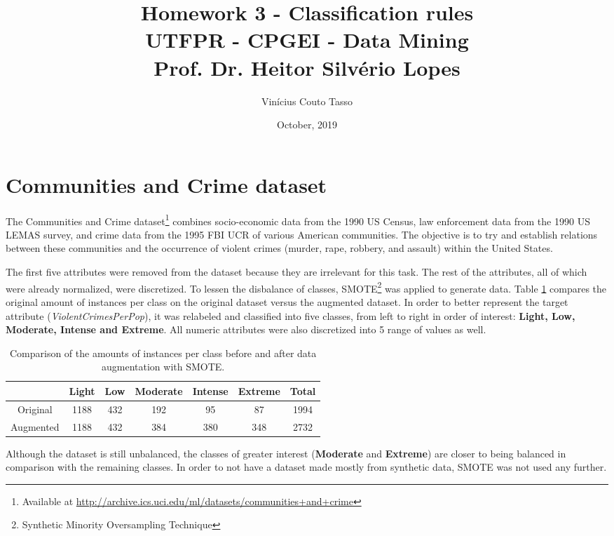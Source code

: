 \documentclass{article}
\title{Homework 3 - Classification rules \\
        \vspace{5px} \large UTFPR - CPGEI - Data Mining \\
        Prof. Dr. Heitor Silvério Lopes}
\author{Vinícius Couto Tasso}
\date{October, 2019}
\begin{document}
\maketitle

\section*{Communities  and  Crime  dataset}

The Communities and Crime dataset\footnote{Available at \href{http://archive.ics.uci.edu/ml/datasets/communities+and+crime}{http://archive.ics.uci.edu/ml/datasets/communities+and+crime}} combines socio-economic data from the 1990 US Census, law enforcement data from the 1990 US LEMAS survey, and crime 
data from the 1995 FBI UCR of various American communities. The objective is to try and establish relations between these communities and the occurrence of violent crimes (murder, rape, robbery, and assault) within the United States.

The first five attributes were removed from the dataset because they are irrelevant for this task. The rest of the attributes, all of which were already normalized, were discretized. To lessen the disbalance of classes, SMOTE\footnote{Synthetic Minority Oversampling Technique} was applied to generate data. Table \ref{tab:smote} compares the original amount of instances per class on the original dataset versus the augmented dataset. In order to better represent the target attribute (\textit{ViolentCrimesPerPop}), it was relabeled and classified into five classes, from left to right in order of interest: \textbf{Light, Low, Moderate, Intense and Extreme}. All numeric attributes were also discretized into 5 range of values as well.

\begin{table}[htp]
    \centering
    \begin{tabular}{c|c|c|c|c|c|c}
         & Light & Low & Moderate & Intense & Extreme & Total \\ \hline
         Original & 1188 & 432 & 192 & 95 & 87 & 1994 \\
         Augmented & 1188 & 432 & 384 & 380 & 348 & 2732 \\
    \end{tabular}
    \caption{Comparison of the amounts of instances per class before and after data augmentation with SMOTE.}
    \label{tab:smote}
\end{table}

Although the dataset is still unbalanced, the classes of greater interest (\textbf{Moderate} and \textbf{Extreme}) are closer to being balanced in comparison with the remaining classes. In order to not have a dataset made mostly from synthetic data, SMOTE was not used any further. 
\end{document}
